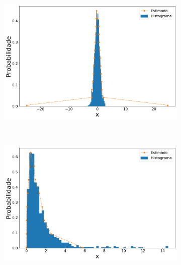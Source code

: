 \begin{figure}[H]
\begin{subfigure}[b]{0.45\textwidth}
		\caption{}
		\label{fig:pdfm_norm15_data_out}
	\end{subfigure}
	\hfill
	\begin{subfigure}[b]{0.45\textwidth}
		\centering 
		\includegraphics[width=\linewidth]{./figuras/PDFm_normal_25_1000_25}
		\caption{}
		\label{fig:pdfm_norm25_data_out}
	\end{subfigure}
	\\
	\begin{subfigure}[b]{0.45\textwidth}
		\centering 
		\includegraphics[width=\linewidth]{./figuras/PDFm_lognormal_15_1000_0}
		\caption{}
		\label{fig:pdfm_lognorm15_data}
	\end{subfigure}
	\hfill
	\begin{subfigure}[b]{0.45\textwidth}
		\centering 

\end{subfigure}
\end{figure}
